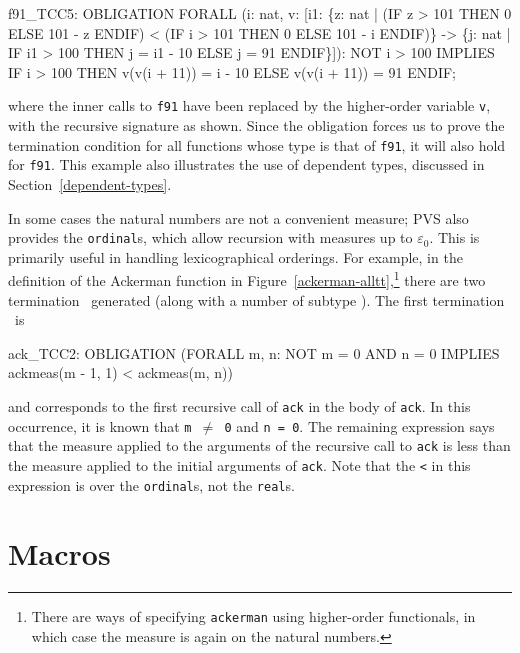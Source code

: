 \begin{pvsex}
f91_TCC5: OBLIGATION
  FORALL (i: nat,
          v: [i1:
               \{z: nat |
                        (IF z > 101 THEN 0 ELSE 101 - z ENDIF) <
                         (IF i > 101 THEN 0 ELSE 101 - i ENDIF)\} ->
               \{j: nat | IF i1 > 100 THEN j = i1 - 10 ELSE j = 91 ENDIF\}]):
    NOT i > 100 IMPLIES
     IF i > 100 THEN v(v(i + 11)) = i - 10 ELSE v(v(i + 11)) = 91 ENDIF;
\end{pvsex}
where the inner calls to \texttt{f91} have been replaced by the
higher-order variable \texttt{v}, with the recursive signature as shown.
Since the obligation forces us to prove the termination condition for all
functions whose type is that of \texttt{f91}, it will also hold for
\texttt{f91}.  This example also illustrates the use of dependent types,
discussed in Section~\ref{dependent-types}.


In some cases the natural numbers are not a convenient measure; PVS
also provides the \texttt{ordinal}s, which allow recursion with measures up
to $\varepsilon_0$.  This is primarily useful in handling
lexicographical orderings.  For example, in the definition of the
Ackerman function in Figure~\ref{ackerman-alltt},\footnote{There are
ways of specifying \texttt{ackerman} using higher-order functionals, in
which case the measure is again on the natural numbers.} there are two
termination \tccs\ generated (along with a number of subtype \tccs).
The first termination \tcc\ is
\begin{pvsex}
  ack_TCC2:
    OBLIGATION
      (FORALL m, n:
        NOT m = 0 AND n = 0 IMPLIES ackmeas(m - 1, 1) < ackmeas(m, n))
\end{pvsex}
%
and corresponds to the first recursive call of \texttt{ack} in the body of
\texttt{ack}.  In this occurrence, it is known that \texttt{m $\neq$ 0}
and \texttt{n = 0}.  The remaining expression says that the measure
applied to the arguments of the recursive call to \texttt{ack} is less
than the measure applied to the initial arguments of \texttt{ack}.  Note
that the \texttt{<} in this expression is over the \texttt{ordinal}s, not
the \texttt{real}s.



\section{Macros}\label{macro-declarations}


